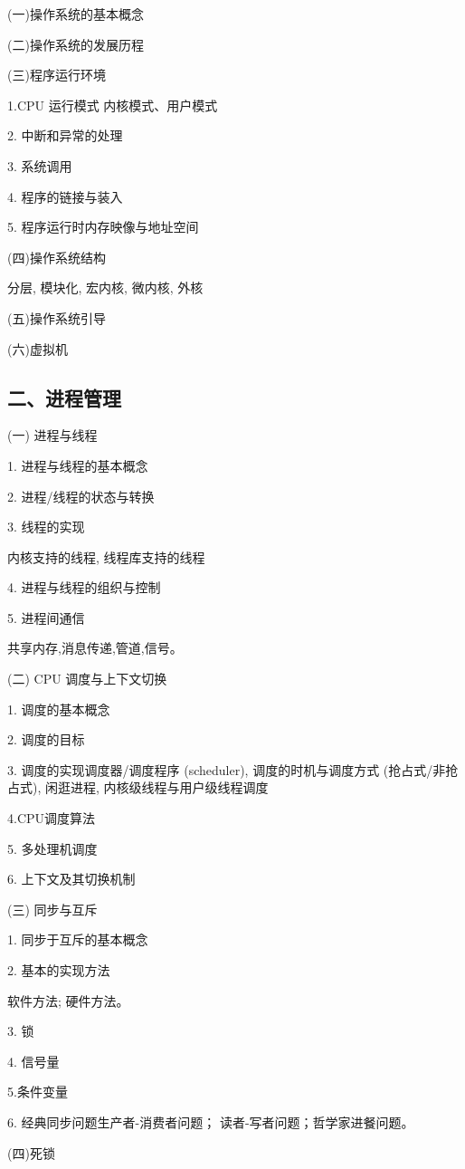 \documentclass[10pt]{article}
\begin{document}
(一)操作系统的基本概念

(二)操作系统的发展历程

(三)程序运行环境

1.CPU 运行模式 内核模式、用户模式

2. 中断和异常的处理

3. 系统调用

4. 程序的链接与装入

5. 程序运行时内存映像与地址空间

{\color{red} (四)操作系统结构

分层, 模块化, 宏内核, 微内核, 外核}

{\color{red} (五)操作系统引导}

{\color{red}(六)虚拟机}
\subsection*{二、进程管理}

(一) 进程与线程

1. 进程与线程的基本概念

2. 进程/线程的状态与转换

3. 线程的实现

内核支持的线程, 线程库支持的线程

4. 进程与线程的组织与控制

5. 进程间通信

{\color{red} 共享内存,消息传递,管道,信号。}

(二) CPU 调度与上下文切换

1. 调度的基本概念 

2. 调度的目标 

3. 调度的实现调度器/调度程序 (scheduler), 调度的时机与调度方式 (抢占式/非抢占式), 闲逛进程, 内核级线程与用户级线程调度 

4.CPU调度算法

{\color{red} 5. 多处理机调度}

6. 上下文及其切换机制

(三) 同步与互斥

1. 同步于互斥的基本概念

2. 基本的实现方法

{\color{red} 软件方法; 硬件方法}。

3. 锁

4. 信号量 

5.条件变量 

6. 经典同步问题生产者-消费者问题；{\color{red} 读者-写者问题；哲学家进餐问题}。

(四)死锁
\end{document}
